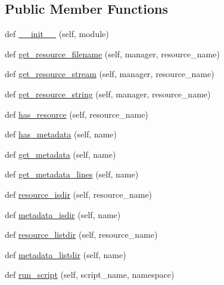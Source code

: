 \subsection*{Public Member Functions}
\begin{DoxyCompactItemize}
\item 
def \hyperlink{classpkg__resources_1_1NullProvider_a7812e3926f7b0ab60ce1a83d685f91cf}{\+\_\+\+\_\+init\+\_\+\+\_\+} (self, module)
\item 
def \hyperlink{classpkg__resources_1_1NullProvider_a1b477013656b7e7ec86d914bf51068da}{get\+\_\+resource\+\_\+filename} (self, manager, resource\+\_\+name)
\item 
def \hyperlink{classpkg__resources_1_1NullProvider_ab8e610dad60b34272be032178b8c1e47}{get\+\_\+resource\+\_\+stream} (self, manager, resource\+\_\+name)
\item 
def \hyperlink{classpkg__resources_1_1NullProvider_a5f92ab9a9056e307359f7cf348bb069f}{get\+\_\+resource\+\_\+string} (self, manager, resource\+\_\+name)
\item 
def \hyperlink{classpkg__resources_1_1NullProvider_a34bb6a57b35a7b35dcadf2558333e152}{has\+\_\+resource} (self, resource\+\_\+name)
\item 
def \hyperlink{classpkg__resources_1_1NullProvider_a670947a5ce4a05cbae651365c5294bbc}{has\+\_\+metadata} (self, name)
\item 
def \hyperlink{classpkg__resources_1_1NullProvider_ac8f8f36f17bcd8a5e9e0621446ec4e6b}{get\+\_\+metadata} (self, name)
\item 
def \hyperlink{classpkg__resources_1_1NullProvider_a3ea4f5544efb05812dea1035eb5643a3}{get\+\_\+metadata\+\_\+lines} (self, name)
\item 
def \hyperlink{classpkg__resources_1_1NullProvider_af31acf6ad0520ee29b7713e2ad331a1a}{resource\+\_\+isdir} (self, resource\+\_\+name)
\item 
def \hyperlink{classpkg__resources_1_1NullProvider_ac64fbb695098a3754d81882a6b3457da}{metadata\+\_\+isdir} (self, name)
\item 
def \hyperlink{classpkg__resources_1_1NullProvider_acba3c4c30764a40146f28cc1be50808a}{resource\+\_\+listdir} (self, resource\+\_\+name)
\item 
def \hyperlink{classpkg__resources_1_1NullProvider_a3cb806ee524e9fe799811bb789d37591}{metadata\+\_\+listdir} (self, name)
\item 
def \hyperlink{classpkg__resources_1_1NullProvider_a03ae8028263462bb68477eb92f1610a2}{run\+\_\+script} (self, script\+\_\+name, namespace)
\end{DoxyCompactItemize}
